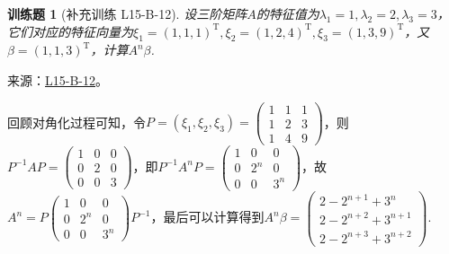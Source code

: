 \documentclass[12pt,fontset=fandol]{ctexart}
\newtheorem{exercise}{训练题}[section]
\begin{document}
\begin{exercise}[补充训练 L15-B-12]\label{prob:L15-B-12}
设三阶矩阵$A$的特征值为$\lambda_1=1,\lambda_2=2,\lambda_3=3$，它们对应的特征向量为$\xi_1=(1,1,1)^\mathrm{T}, \xi_2=(1,2,4)^\mathrm{T},\xi_3=(1,3,9)^\mathrm{T}$，又$\beta=(1,1,3)^\mathrm{T}$，计算$A^n\beta$.
\end{exercise}
\noindent 来源：\href{https://github.com/yhwu-is/Linear-Algebra-Left-Undone/blob/new/%E8%AE%B2%E4%B9%89/%E4%B8%93%E9%A2%98/15%20%E7%9B%B8%E4%BC%BC%E6%A0%87%E5%87%86%E5%BD%A2%EF%BC%9A%E5%A4%8D%E6%95%B0%E5%9F%9F%E4%B8%8A%E7%9A%84%E5%B0%9D%E8%AF%95%E4%B8%8E%E7%90%86%E8%AE%BA.tex}{L15-B-12}。
\begin{solve}
回顾对角化过程可知，令$P=(\xi_1,\xi_2,\xi_3)=\begin{pmatrix}
                1 & 1 & 1 \\ 1 & 2 & 3 \\ 1 & 4 & 9
            \end{pmatrix}$，则$P^{-1}AP=\begin{pmatrix}
                1 & 0 & 0 \\ 0 & 2 & 0 \\ 0 & 0 & 3
            \end{pmatrix}$，即$P^{-1}A^nP=\begin{pmatrix}
                1 & 0 & 0 \\ 0 & 2^n & 0 \\ 0 & 0 & 3^n
            \end{pmatrix}$，故$A^n=P\begin{pmatrix}
                1 & 0 & 0 \\ 0 & 2^n & 0 \\ 0 & 0 & 3^n
            \end{pmatrix}P^{-1}$，最后可以计算得到$A^n\beta=\begin{pmatrix}
                2-2^{n+1}+3^n \\ 2-2^{n+2}+3^{n+1} \\ 2-2^{n+3}+3^{n+2}
            \end{pmatrix}$.
\end{solve}
\end{document}
